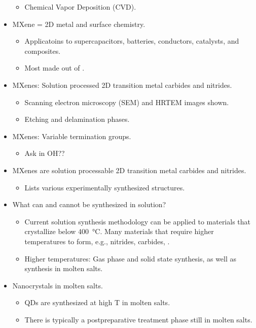 \documentclass[../notes.tex]{subfiles}
\begin{document}
\begin{itemize}
\begin{itemize}
        \item Chemical Vapor Deposition (CVD).
    \end{itemize}
    \item MXene = 2D metal and surface chemistry.
    \begin{itemize}
        \item Applicatoins to supercapacitors, batteries, conductors, catalysts, and composites.
        \item Most made out of .
    \end{itemize}
    \item MXenes: Solution processed 2D transition metal carbides and nitrides.
    \begin{itemize}
        \item Scanning electron microscopy (SEM) and HRTEM images shown.
        \item Etching and delamination phases.
    \end{itemize}
    \item MXenes: Variable termination groups.
    \begin{itemize}
        \item Ask in OH??
    \end{itemize}
    \item MXenes are solution processable 2D transition metal carbides and nitrides.
    \begin{itemize}
        \item Lists various experimentally synthesized structures.
    \end{itemize}
    \item What can and cannot be synthesized in solution?
    \begin{itemize}
        \item Current solution synthesis methodology can be applied to materials that crystallize below \SI{400}{\celsius}. Many materials that require higher temperatures to form, e.g., nitrides, carbides, .
        \item Higher temperatures: Gas phase and solid state synthesis, as well as synthesis in molten salts.
    \end{itemize}
    \item Nanocrystals in molten salts.
    \begin{itemize}
        \item QDs are synthesized at high T in molten salts.
        \item There is typically a postpreparative treatment phase still in molten salts.

\end{itemize}
\end{itemize}
\end{document}
